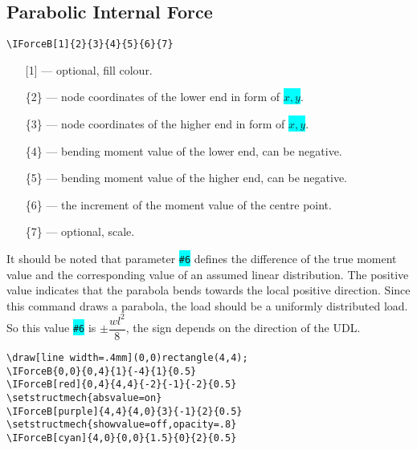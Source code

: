 \documentclass[10pt,a4paper]{article}
\newcommand*{\Highlight}[1]{\colorbox{cyan}{\color{red}\texttt{#1}}}
\begin{document}
\subsection{Parabolic Internal Force}
\begin{Verbatim}[frame=single,label=Syntax]
\IForceB[1]{2}{3}{4}{5}{6}{7}
\end{Verbatim}
\begin{enumerate}
\item[][1] --- optional, fill colour.
\item[]\{2\} --- node coordinates of the lower end in form of \Highlight{$x,y$}.
\item[]\{3\} --- node coordinates of the higher end in form of \Highlight{$x,y$}.
\item[]\{4\} --- bending moment value of the lower end, can be negative.
\item[]\{5\} --- bending moment value of the higher end, can be negative.
\item[]\{6\} --- the increment of the moment value of the centre point.
\item[]\{7\} --- optional, scale.
\end{enumerate}
It should be noted that parameter \Highlight{\#6} defines the difference of the true moment value and the corresponding value of an assumed linear distribution. The positive value indicates that the parabola bends towards the local positive direction. Since this command draws a parabola, the load should be a uniformly distributed load. So this value \Highlight{\#6} is $\pm\dfrac{wl^2}{8}$, the sign depends on the direction of the UDL.
\begin{Verbatim}[frame=single,label=Example]
\draw[line width=.4mm](0,0)rectangle(4,4);
\IForceB{0,0}{0,4}{1}{-4}{1}{0.5}
\IForceB[red]{0,4}{4,4}{-2}{-1}{-2}{0.5}
\setstructmech{absvalue=on}
\IForceB[purple]{4,4}{4,0}{3}{-1}{2}{0.5}
\setstructmech{showvalue=off,opacity=.8}
\IForceB[cyan]{4,0}{0,0}{1.5}{0}{2}{0.5}
\end{Verbatim}
\begin{figure}[H]
\centering
{}
\end{figure}
\end{document}
